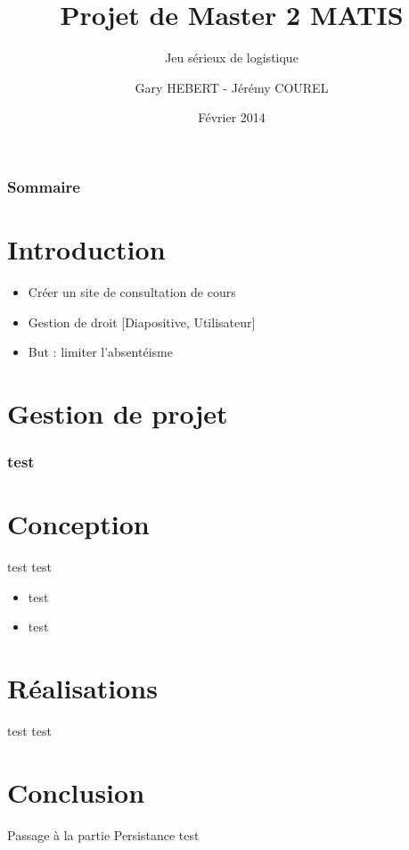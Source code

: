 \documentclass{beamer}
\title{Projet de Master 2 MATIS}
\subtitle{Jeu sérieux de logistique}
\author{Gary HEBERT - Jérémy COUREL}
\date{Février 2014}
\begin{document}
\begin{frame}[plain]
  \titlepage
\end{frame}

\begin{frame}[plain]
 \frametitle{Sommaire}
 \tableofcontents
\end{frame}
\section*{Introduction}
  \begin{frame}
  \begin{itemize}
    \item Créer un site de consultation de cours
    \newline
    \item Gestion de droit [Diapositive, Utilisateur]
    \newline
    \item But : limiter l'absentéisme
  \end{itemize}
  \end{frame}


\section{Gestion de projet}

    \begin{frame}
      \frametitle{test}
      \begin{figure}
      \end{figure}
    \end{frame}



\section{Conception}
\begin{frame}
  \begin{block}{test}
    test
  \end{block}
  \begin{itemize}
    \item test
    \item test
  \end{itemize}
\end{frame}

\section{Réalisations}
	\begin{frame}
		\begin{block}{test}
			test
		\end{block}
	\end{frame}

\section*{Conclusion}
	\begin{frame}
		\begin{block}{Passage à la partie Persistance}
			test
		\end{block}
	\end{frame}
    
\end{document}
